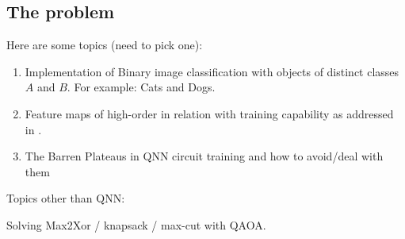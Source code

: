 \subsection{The problem}
Here are some topics (need to pick one):
\begin{enumerate}
    \item Implementation of Binary image classification with objects of distinct classes $A$ and $B$. For example: Cats and Dogs.
    \item Feature maps of high-order in relation with training capability as addressed in \cite{abbasPowerQuantumNeural2021}.
    \item The Barren Plateaus in QNN circuit training and how to avoid/deal with them
\end{enumerate}
Topics other than QNN:

Solving Max2Xor / knapsack / max-cut with QAOA.